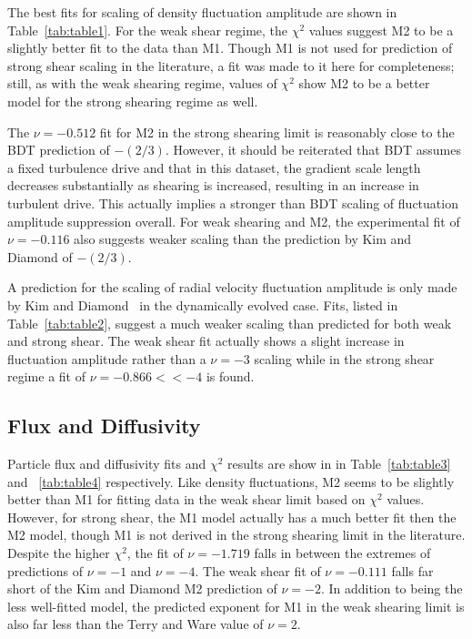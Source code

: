 \documentclass[aip,pop,amsmath,amssymb,reprint,superscriptaddress]{revtex4-1} %
\begin{document}
The best fits for scaling of density fluctuation amplitude are shown in Table~\ref{tab:table1}. For the weak shear regime, the $\chi^{2}$ values suggest M2 to be a slightly better fit to the data than M1. Though M1 is not used for prediction of strong shear scaling in the literature, a fit was made to it here for completeness; still, as with the weak shearing regime, values of $\chi^{2}$ show M2 to be a better model for the strong shearing regime as well.

The $\nu = -0.512$ fit for M2 in the strong shearing limit is reasonably close to the BDT prediction of $-(2/3)$. However, it should be reiterated that BDT assumes a fixed turbulence drive and that in this dataset, the gradient scale length decreases substantially as shearing is increased, resulting in an increase in turbulent drive.  This actually implies a stronger than BDT scaling of fluctuation amplitude suppression overall. For weak shearing and M2, the experimental fit of $\nu = -0.116$ also suggests weaker scaling than the prediction by Kim and Diamond of $-(2/3)$.

A prediction for the scaling of radial velocity fluctuation amplitude is only made by Kim and Diamond~\cite{kim04} in the dynamically evolved case. Fits, listed in Table~\ref{tab:table2}, suggest a much weaker scaling than predicted for both weak and strong shear. The weak shear fit actually shows a slight increase in fluctuation amplitude rather than a $\nu = -3$ scaling while in the strong shear regime a fit of $\nu = -0.866 << -4$ is found.

\subsection{Flux and Diffusivity}

Particle flux and diffusivity fits and $\chi^{2}$ results are show in in Table~\ref{tab:table3} and ~\ref{tab:table4} respectively. Like density fluctuations, M2 seems to be slightly better than M1 for fitting data in the weak shear limit based on $\chi^{2}$ values.  However, for strong shear, the M1 model actually has a much better fit then the M2 model, though M1 is not derived in the strong shearing limit in the literature. Despite the higher $\chi^{2}$, the fit of $\nu = -1.719$ falls in between the extremes of predictions of $\nu = -1$ and $\nu = -4$. The weak shear fit of $\nu = -0.111$ falls far short of the Kim and Diamond M2 prediction of $\nu = -2$. In addition to being the less well-fitted model, the predicted exponent for M1 in the weak shearing limit is also far less than the Terry and Ware value of $\nu = 2$.
\end{document}

